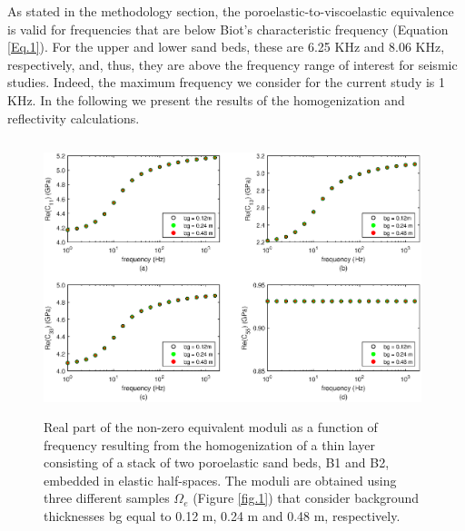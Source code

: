 \documentclass[draft]{agujournal2019}
\begin{document}
As stated in the methodology section, the poroelastic-to-viscoelastic equivalence is valid for frequencies that are below Biot's characteristic frequency (Equation \eqref{Eq.1}). For the upper and lower sand beds, these are 6.25 KHz and 8.06 KHz, respectively, and, thus, they are above the frequency range of interest for seismic studies. Indeed, the maximum frequency we consider for the current study is 1 KHz. 
In the following we present the results of the homogenization and reflectivity calculations.
\begin{figure}[!ht]
\centering
        \includegraphics[width=110mm, height=80mm]{Figure2.eps}
\caption{Real part of the non-zero equivalent moduli as a function of frequency resulting from the homogenization of a thin layer consisting of a stack of two poroelastic sand beds, B1 and B2, embedded in elastic half-spaces. The moduli are obtained using three different samples $\Omega_e$ (Figure \ref{fig.1}) that consider background thicknesses bg equal to 0.12 m, 0.24 m and 0.48 m, respectively.}
\label{fig.2}
\end{figure}
\end{document}
